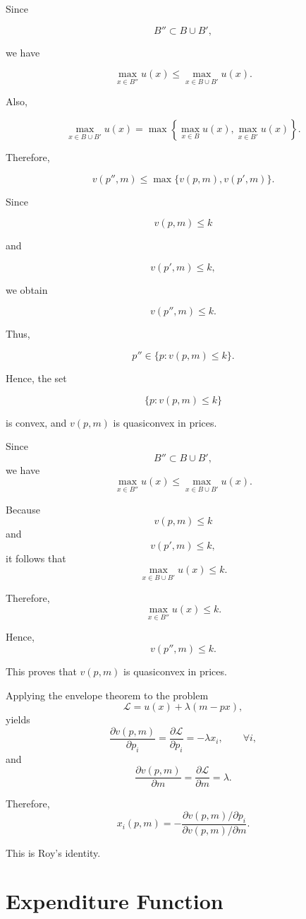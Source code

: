 Since

\[
B''\subset B\cup B',
\]

we have

\[
\max_{x\in B''}u(x)
\le
\max_{x\in B\cup B'}u(x).
\]

Also,

\[
\max_{x\in B\cup B'}u(x)
=
\max
\left\{
\max_{x\in B}u(x),
\max_{x\in B'}u(x)
\right\}.
\]

Therefore,

\[
v(p'',m)
\le
\max\{v(p,m),v(p',m)\}.
\]

Since

\[
v(p,m)\le k
\]

and

\[
v(p',m)\le k,
\]

we obtain

\[
v(p'',m)\le k.
\]

Thus,

\[
p''\in \{p:v(p,m)\le k\}.
\]

Hence, the set

\[
\{p:v(p,m)\le k\}
\]

is convex, and \(v(p,m)\) is quasiconvex in prices.



Since
\[
B''\subset B\cup B',
\]
we have
\[
\max_{x\in B''}u(x)
\le
\max_{x\in B\cup B'}u(x).
\]

Because
\[
v(p,m)\le k
\]
and
\[
v(p',m)\le k,
\]
it follows that
\[
\max_{x\in B\cup B'}u(x)\le k.
\]

Therefore,
\[
\max_{x\in B''}u(x)\le k.
\]

Hence,
\[
v(p'',m)\le k.
\]

This proves that \(v(p,m)\) is quasiconvex in prices.

\medskip

Applying the envelope theorem to the problem
\[
\mathcal{L}
=
u(x)+\lambda(m-px),
\]
yields
\[
\frac{\partial v(p,m)}{\partial p_i}
=
\frac{\partial \mathcal{L}}{\partial p_i}
=
-\lambda x_i,
\qquad
\forall i,
\]
and
\[
\frac{\partial v(p,m)}{\partial m}
=
\frac{\partial \mathcal{L}}{\partial m}
=
\lambda.
\]

Therefore,
\[
x_i(p,m)
=
-
\frac{
\partial v(p,m)/\partial p_i
}{
\partial v(p,m)/\partial m
}.
\]

This is Roy's identity.

\section{Expenditure Function}

